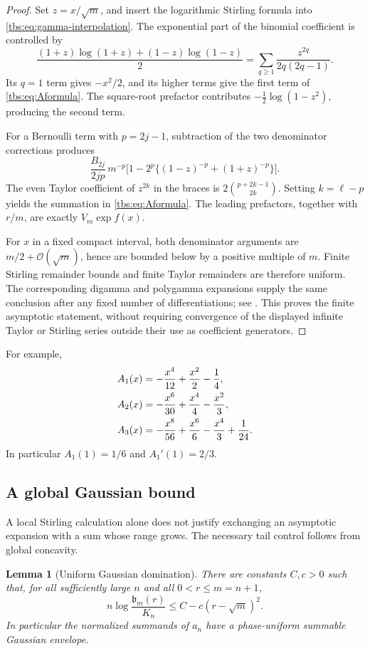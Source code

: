 \documentclass[11pt,a4paper]{article}
\numberwithin{equation}{section}
\newtheorem{lemma}[theorem]{Lemma}
\theoremstyle{definition}
\newcommand{\bcont}{\mathfrak b}
\newcommand{\OO}{\mathcal O}
\begin{document}
\begin{proof}
Set $z=x/\sqrt m$, and insert the logarithmic Stirling formula into
\eqref{tbs:eq:gamma-interpolation}. The exponential part of the binomial
coefficient is controlled by
\[
 \frac{(1+z)\log(1+z)+(1-z)\log(1-z)}2
 =\sum_{q\ge1}\frac{z^{2q}}{2q(2q-1)}.
\]
Its $q=1$ term gives $-x^2/2$, and its higher terms give the first term
of \eqref{tbs:eq:Aformula}. The square-root prefactor contributes
$-\frac12\log(1-z^2)$, producing the second term.

For a Bernoulli term with $p=2j-1$, subtraction of the two denominator
corrections produces
\[
 \frac{B_{2j}}{2jp}\,m^{-p}
 \bigl[1-2^p\{(1-z)^{-p}+(1+z)^{-p}\}\bigr].
\]
The even Taylor coefficient of $z^{2k}$ in the braces is
$2\binom{p+2k-1}{2k}$. Setting $k=\ell-p$ yields the summation in
\eqref{tbs:eq:Aformula}. The leading prefactors, together with $r/m$, are
exactly $V_m\exp f(x)$.

For $x$ in a fixed compact interval, both denominator arguments are
$m/2+\OO(\sqrt m)$, hence are bounded below by a positive multiple of
$m$. Finite Stirling remainder bounds and finite Taylor remainders are
therefore uniform. The corresponding digamma and polygamma expansions
supply the same conclusion after any fixed number of differentiations;
see \cite{dlmfgamma,dlmfpolygamma}. This proves the finite asymptotic
statement, without requiring convergence of the displayed infinite
Taylor or Stirling series outside their use as coefficient generators.
\end{proof}

For example,
\begin{align}
 A_1(x)&=-\frac{x^4}{12}+\frac{x^2}{2}-\frac14,\notag\\
 A_2(x)&=-\frac{x^6}{30}+\frac{x^4}{4}-\frac{x^2}{3},\label{tbs:eq:Aexamples}\\
 A_3(x)&=-\frac{x^8}{56}+\frac{x^6}{6}-\frac{x^4}{3}+\frac1{24}.
 \notag
\end{align}
In particular $A_1(1)=1/6$ and $A_1'(1)=2/3$.

\subsection{A global Gaussian bound}
A local Stirling calculation alone does not justify exchanging an
asymptotic expansion with a sum whose range grows. The necessary tail
control follows from global concavity.

\begin{lemma}[Uniform Gaussian domination]\label{tbs:lem:gaussian}
There are constants $C,c>0$ such that, for all sufficiently large $n$ and
all $0<r\le m=n+1$,
\begin{equation}\label{tbs:eq:global-envelope}
 n\log\frac{\bcont_m(r)}{K_n}\le C-c(r-\sqrt m)^2.
\end{equation}
In particular the normalized summands of $a_n$ have a phase-uniform
summable Gaussian envelope.
\end{lemma}
\end{document}
